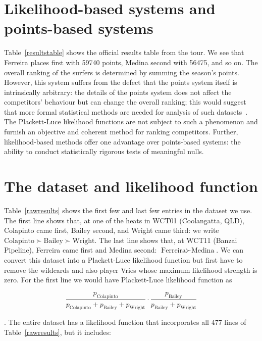 \documentclass{article}
\begin{document}
\section{Likelihood-based systems and points-based systems}


Table~\ref{resultstable} shows the official results table from the
tour.  We see that Ferreira places first with 59740 points, Medina
second with 56475, and so on.  The overall ranking of the surfers is
determined by summing the season's points.  However, this system
suffers from the defect that the points system itself is intrinsically
arbitrary: the details of the points system does not affect the
competitors' behaviour but can change the overall ranking; this would
suggest that more formal statistical methods are needed for analysis
of such datasets~\citep{aldous2017}.  The Plackett-Luce likelihood
functions are not subject to such a phenomenon and furnish an
objective and coherent method for ranking competitors.  Further,
likelihood-based methods offer one advantage over points-based
systems: the ability to conduct statistically rigorous tests of
meaningful nulls.

\section{The dataset and likelihood function}

Table~\ref{rawresults} shows the first few and last few entries in the
dataset we use.  The first line shows that, at one of the heats in
WCT01 (Coolangatta, QLD), Colapinto came first, Bailey second, and
Wright came third: we write
$\mbox{Colapinto}\succ\mbox{Bailey}\succ\mbox{Wright}$.  The last line
shows that, at WCT11 (Banzai Pipeline), Ferreira came first and Medina
second: $\mbox{Ferreira}\succ\mbox{Medina}$.  We can convert this
dataset into a Plackett-Luce likelihood function but first have to
remove the wildcards and also player Vries whose maximum likelihood
strength is zero.  For the first line we would have Plackett-Luce
likelihood function as

\begin{equation}
\frac{p_\mathrm{Colapinto}}{p_\mathrm{Colapinto} + p_\mathrm{Bailey} + p_\mathrm{Wright}}\cdot
\frac{p_\mathrm{Bailey}}{p_\mathrm{Bailey} + p_\mathrm{Wright}}
\end{equation}

.  The entire dataset has a likelihood function
that incorporates all 477 lines of Table~\ref{rawresults}, but it
includes:
\end{document}
